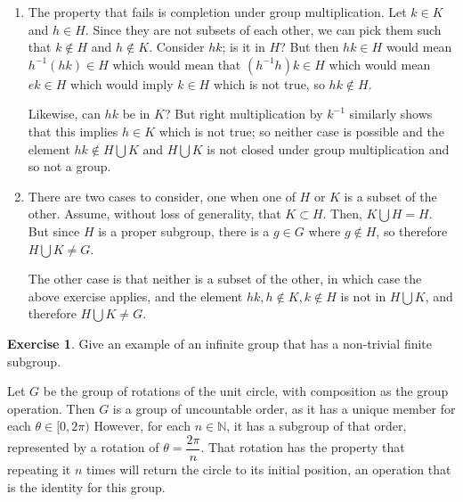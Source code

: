 \documentclass[11pt,oneside]{article}
\numberwithin{equation}{section}
\theoremstyle{definition}
\newtheorem{exercise}{Exercise}
\def\NN{\mathbb{N}}
\begin{document}
\begin{solution}
  \begin{enumerate}[(1)]
    \item
  The property that fails is completion under group multiplication.
  Let $k \in K$ and $ h \in H$. Since they are not subsets of each
  other, we can pick them such that $ k \notin H$ and $h \notin K$.
  Consider $h k$; is it in $H$?  But then $ h k \in H $ would mean $ h
  ^ {-1} ( h k ) \in H$ which would mean that $ ( h ^ { -1 } h ) k \in
  H $ which would mean $ e k \in H $ which would imply $ k \in H $
  which is not true, so $ h k \notin H$.

  Likewise, can $ h k $ be in $K$?  But right multiplication by $ k ^
  { -1 } $ similarly shows that this implies $ h \in K $ which is not
  true; so neither case is possible and the element $ h k \notin H
  \bigcup K $ and $ H \bigcup K $ is not closed under group
  multiplication and so not a group.
\item
  There are two cases to consider, one when one of $H$ or $K$ is a subset of
  the other.  Assume, without loss of generality, that $ K \subset H $.
  Then, $ K \bigcup H = H$.  But since $H$ is a proper subgroup, there is a
  $ g \in G$ where $g \notin H$, so therefore $H \bigcup K \neq G$.

  The other case is that neither is a subset of the other, in which
  case the above exercise applies, and the element $ hk, h \notin K, k
  \notin H$ is not in $ H \bigcup K$, and therefore $H \bigcup K \neq G$.
  \end{enumerate}

\end{solution}


\begin{exercise}
  Give an example of an infinite group that has a non-trivial finite subgroup.  
\end{exercise}

\begin{solution}
  Let $G$ be the group of rotations of the unit circle, with
  composition as the group operation.  Then $G$ is a group of
  uncountable order, as it has a unique member for each $ \theta \in [
    0, 2 \pi ) $ However, for each $ n \in \NN$, it has a
    subgroup of that order, represented by a rotation of $ \theta = \dfrac{2 \pi}{n}$.
    That rotation has the property that repeating
    it $n$ times will return the circle to its initial position, an
    operation that is the identity for this group.
\end{solution}
\end{document}
